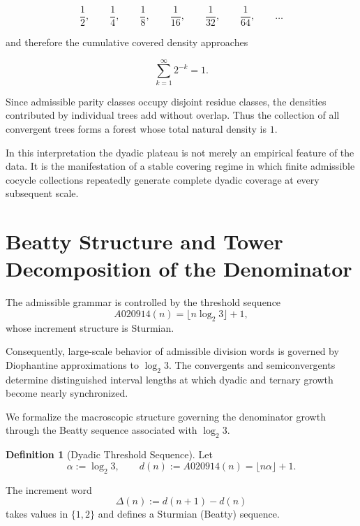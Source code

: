 \documentclass[12pt, oneside]{article}
\numberwithin{equation}{section}
\theoremstyle{definition}
\newtheorem{definition}{Definition}[section]
\theoremstyle{plain}
\theoremstyle{remark}
\begin{document}
\[
\frac{1}{2}, \qquad
\frac{1}{4}, \qquad
\frac{1}{8}, \qquad
\frac{1}{16}, \qquad
\frac{1}{32}, \qquad
\frac{1}{64}, \qquad
\ldots
\]

and therefore the cumulative covered density approaches

\[
\sum_{k=1}^{\infty}2^{-k}=1.
\]

Since admissible parity classes occupy disjoint residue classes, the densities
contributed by individual trees add without overlap. Thus the collection of all
convergent trees forms a forest whose total natural density is $1$.

In this interpretation the dyadic plateau is not merely an empirical feature of
the data. It is the manifestation of a stable covering regime in which finite
admissible cocycle collections repeatedly generate complete dyadic coverage at
every subsequent scale.


\section{Beatty Structure and Tower Decomposition of the Denominator}
\label{sec:beatty-towers}

The admissible grammar is controlled by the threshold sequence
\[
A020914(n)=\lfloor n\log_2 3\rfloor+1,
\]
whose increment structure is Sturmian.

Consequently, large-scale behavior of admissible division words is governed
by Diophantine approximations to \(\log_2 3\). The convergents and
semiconvergents determine distinguished interval lengths at which dyadic
and ternary growth become nearly synchronized.

We formalize the macroscopic structure governing the denominator growth
through the Beatty sequence associated with $\log_2 3$.


\begin{definition}[Dyadic Threshold Sequence]
Let
\[
\alpha := \log_2 3,
\qquad
d(n) := A020914(n) = \lfloor n\alpha \rfloor + 1.
\]
\end{definition}

The increment word
\[
\Delta(n) := d(n+1)-d(n)
\]
takes values in $\{1,2\}$ and defines a Sturmian (Beatty) sequence.

\end{document}
